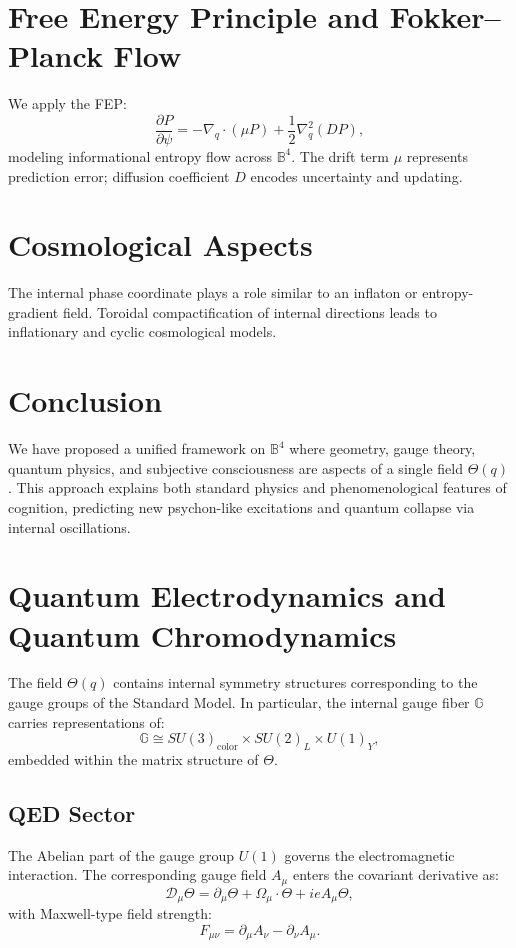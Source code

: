 \documentclass[12pt]{article}
\begin{document}
\section{Free Energy Principle and Fokker–Planck Flow}

We apply the FEP:
\[
\frac{\partial P}{\partial \psi} = -\nabla_q \cdot (\mu P) + \frac{1}{2} \nabla_q^2 (D P),
\]
modeling informational entropy flow across \( \mathbb{B}^4 \). The drift term $\mu$ represents prediction error; diffusion coefficient $D$ encodes uncertainty and updating.

\section{Cosmological Aspects}

The internal phase coordinate plays a role similar to an inflaton or entropy-gradient field. Toroidal compactification of internal directions leads to inflationary and cyclic cosmological models.

\section{Conclusion}

We have proposed a unified framework on \( \mathbb{B}^4 \) where geometry, gauge theory, quantum physics, and subjective consciousness are aspects of a single field \( \Theta(q) \). This approach explains both standard physics and phenomenological features of cognition, predicting new psychon-like excitations and quantum collapse via internal oscillations.


\section{Quantum Electrodynamics and Quantum Chromodynamics}

The field \( \Theta(q) \) contains internal symmetry structures corresponding to the gauge groups of the Standard Model. In particular, the internal gauge fiber \( \mathbb{G} \) carries representations of:
\[
\mathbb{G} \cong SU(3)_\text{color} \times SU(2)_L \times U(1)_Y,
\]
embedded within the matrix structure of \( \Theta \).

\subsection{QED Sector}

The Abelian part of the gauge group \( U(1) \) governs the electromagnetic interaction. The corresponding gauge field \( A_\mu \) enters the covariant derivative as:
\[
\mathcal{D}_\mu \Theta = \partial_\mu \Theta + \Omega_\mu \cdot \Theta + i e A_\mu \Theta,
\]
with Maxwell-type field strength:
\[
F_{\mu\nu} = \partial_\mu A_\nu - \partial_\nu A_\mu.
\]
\end{document}
